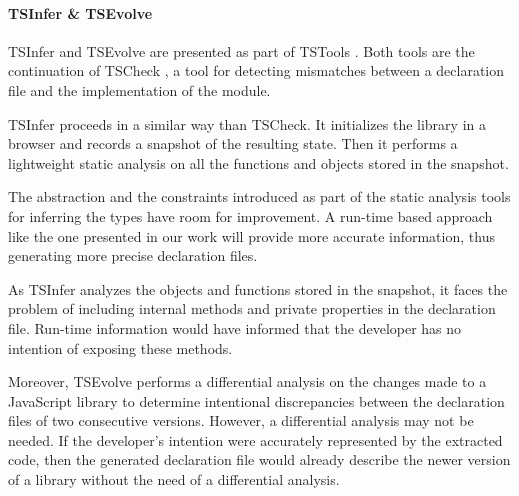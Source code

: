 \documentclass[sigconf]{acmart}
\begin{document}






\paragraph*{TSInfer \& TSEvolve}
TSInfer and TSEvolve are presented as part of TSTools
\cite{DBLP:conf/fase/KristensenM17}. Both tools are the continuation of TSCheck
\cite{DBLP:conf/oopsla/FeldthausM14}, a tool for detecting mismatches between a
declaration file and the implementation of the module. 

TSInfer proceeds in a similar way than TSCheck. It initializes the library in a browser
and records a snapshot of the resulting state.  Then it performs a lightweight static
analysis on all the functions and objects stored in the snapshot. 

The abstraction and the constraints introduced as part of the static analysis tools
for inferring the types have room for improvement. A run-time based approach like the one
presented in our work will provide more accurate information, thus generating more precise
declaration files.

As TSInfer analyzes the objects and functions stored in the snapshot, it faces the problem
of including internal methods and private properties in the declaration file. Run-time
information would have informed that the developer has no intention of exposing these
methods. 

Moreover, TSEvolve performs a differential analysis on the changes made to a JavaScript
library to determine intentional discrepancies between the declaration files of two
consecutive versions. However, a differential analysis may not be needed. If the
developer's intention were accurately represented by the extracted code, then the generated
declaration file would already describe the newer version of a library without the need of
a differential analysis.
\end{document}
